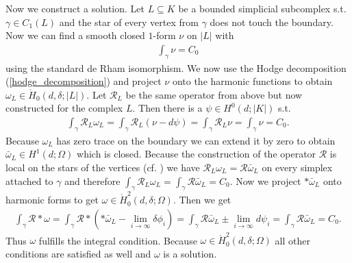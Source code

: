\documentclass[12pt,a4paper]{article}
\theoremstyle{definition}
\newcommand{\rop}{\mathscr{R}} %
\begin{document}
Now we construct a solution. Let $L \subseteq K$ be a bounded
simplicial subcomplex s.t. $\gamma \in C_1(L)$ and the star of 
every vertex from $\gamma$ does not touch the boundary. Now we can 
find a smooth closed $1$-form $\nu$ on $|L|$ with 
\begin{align*}
    \int_\gamma \nu = C_0
\end{align*}
using the standard de Rham isomorphism. We now use the Hodge decomposition
(\ref{hodge_decomposition}) and project $\nu$ onto the harmonic functions 
to obtain $\omega_L \in \mathring{H}_0(d,\delta;|L|)$. Let 
$\rop_L$ be the same operator from above but now constructed for the 
complex $L$. Then there is a $\psi \in H^0(d;|K|)$ s.t.
\begin{align*}
    \int_\gamma \rop_L \omega_L = \int_\gamma \rop_L (\nu - d\psi) =
    \int_\gamma \rop_L \nu = \int_\gamma \nu = C_0.
\end{align*}
Because $\omega_L$ has zero trace on the boundary we can extend it by zero to 
obtain $\bar{\omega}_L \in H^1(d;\Omega)$ which is closed. 
Because the construction of the operator $\rop$ is local on the stars 
of the vertices
(cf. \cite{goldshtein}) we have $\rop_L \omega_L = \rop \bar{\omega}_L$ on 
every simplex attached to $\gamma$ and therefore 
$\int_\gamma \rop_L \omega_L = \int_\gamma \rop \bar{\omega}_L = C_0$. 
Now we project $*\bar{\omega}_L$ onto harmonic forms to get 
$\omega \in \mathring{H}^2_0(d,\delta;\Omega)$. Then we get
\begin{align*}
    \int_\gamma \rop * \omega = \int_\gamma \rop *(*\bar{\omega}_L - 
    \lim\limits_{i \rightarrow \infty}\delta \phi_i) = 
    \int_\gamma \rop \bar{\omega}_L \pm 
    \lim\limits_{i \rightarrow \infty}d \psi_i = 
    \int_\gamma \rop \bar{\omega}_L = C_0.
\end{align*}
Thus $\omega$ fulfills the integral condition. 
Because $\omega \in \mathring{H}^2_0(d,\delta;\Omega)$ all other conditions 
are satisfied as well and $\omega$ is a solution.


\end{document}
